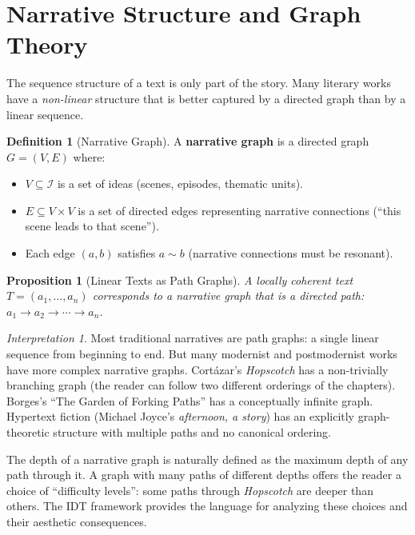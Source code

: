 \documentclass[11pt,openany]{book}
\theoremstyle{definition}
\newtheorem{definition}[axiom]{Definition}
\theoremstyle{plain}
\newtheorem{proposition}[axiom]{Proposition}
\theoremstyle{remark}
\newtheorem{interpretation}[axiom]{Interpretation}
\newcommand{\IS}{\mathcal{I}}               %
\newcommand{\res}{\sim}                      %
\begin{document}
\section{Narrative Structure and Graph Theory}

The sequence structure of a text is only part of the story. Many literary works have a \emph{non-linear} structure that is better captured by a directed graph than by a linear sequence.

\begin{definition}[Narrative Graph]
A \textbf{narrative graph} is a directed graph $G = (V, E)$ where:
\begin{itemize}
\item $V \subseteq \IS$ is a set of ideas (scenes, episodes, thematic units).
\item $E \subseteq V \times V$ is a set of directed edges representing narrative connections (``this scene leads to that scene'').
\item Each edge $(a, b)$ satisfies $a \res b$ (narrative connections must be resonant).
\end{itemize}
\end{definition}

\begin{proposition}[Linear Texts as Path Graphs]
A locally coherent text $T = (a_1, \ldots, a_n)$ corresponds to a narrative graph that is a directed path: $a_1 \to a_2 \to \cdots \to a_n$.
\end{proposition}

\begin{interpretation}
Most traditional narratives are path graphs: a single linear sequence from beginning to end. But many modernist and postmodernist works have more complex narrative graphs. Cortázar's \emph{Hopscotch} has a non-trivially branching graph (the reader can follow two different orderings of the chapters). Borges's ``The Garden of Forking Paths'' has a conceptually infinite graph. Hypertext fiction (Michael Joyce's \emph{afternoon, a story}) has an explicitly graph-theoretic structure with multiple paths and no canonical ordering.

The depth of a narrative graph is naturally defined as the maximum depth of any path through it. A graph with many paths of different depths offers the reader a choice of ``difficulty levels'': some paths through \emph{Hopscotch} are deeper than others. The IDT framework provides the language for analyzing these choices and their aesthetic consequences.
\end{interpretation}
\end{document}
